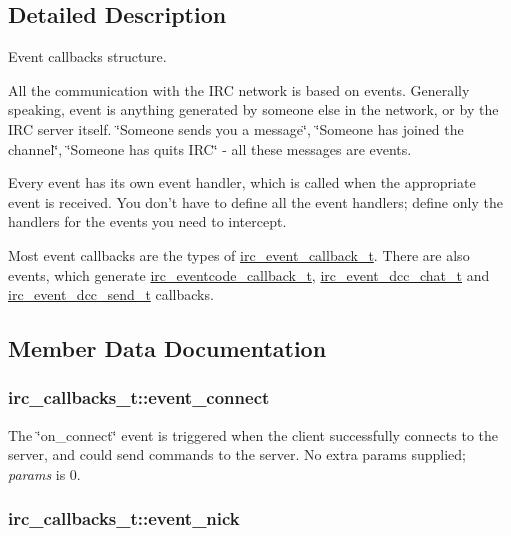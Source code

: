 \subsection{Detailed Description}
Event callbacks structure. 

All the communication with the IRC network is based on events. Generally speaking, event is anything generated by someone else in the network, or by the IRC server itself. \char`\"{}Someone sends you a message\char`\"{}, \char`\"{}Someone has joined the channel\char`\"{}, \char`\"{}Someone has quits IRC\char`\"{} - all these messages are events.

Every event has its own event handler, which is called when the appropriate event is received. You don't have to define all the event handlers; define only the handlers for the events you need to intercept.

Most event callbacks are the types of \hyperlink{libirc__events_8h_c472d3e37df8f172fed3d75e649fac14}{irc\_\-event\_\-callback\_\-t}. There are also events, which generate \hyperlink{libirc__events_8h_b6000d309e87cfb727dcad0136fcb79f}{irc\_\-eventcode\_\-callback\_\-t}, \hyperlink{libirc__events_8h_8c3ddaa55e5ded002b5054f0b926381c}{irc\_\-event\_\-dcc\_\-chat\_\-t} and \hyperlink{libirc__events_8h_5f4b1d95f2d6619041f993ba748544cf}{irc\_\-event\_\-dcc\_\-send\_\-t} callbacks. 

\subsection{Member Data Documentation}
\hypertarget{structirc__callbacks__t_7294e75ca74ba6dc2b5c18ef8e7795a2}{
\subsubsection[event\_\-connect]{ {\bf irc\_\-callbacks\_\-t::event\_\-connect}}}
\label{structirc__callbacks__t_7294e75ca74ba6dc2b5c18ef8e7795a2}


The \char`\"{}on\_\-connect\char`\"{} event is triggered when the client successfully connects to the server, and could send commands to the server. No extra params supplied; {\em params\/} is 0. \hypertarget{structirc__callbacks__t_6151296f8a888132bd25d7db67ff70a5}{
\subsubsection[event\_\-nick]{ {\bf irc\_\-callbacks\_\-t::event\_\-nick}}}
\label{structirc__callbacks__t_6151296f8a888132bd25d7db67ff70a5}


